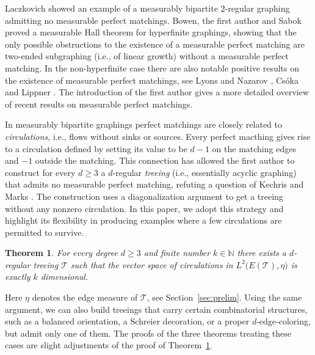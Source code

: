 \documentclass[10pt]{article}
\theoremstyle{plain}
\newtheorem{theorem}[lemma]{Theorem}
\theoremstyle{remark}
\newcommand{\1}{\mathbbm{1}}
\newcommand{\mcT}{\mathcal{T}}
\numberwithin{equation}{section}
\begin{document}
Laczkovich \cite{laczkovich1988closed} showed an example of a measurably bipartite $2$-regular graphing admitting no measurable perfect matchings. Bowen, the first author and Sabok proved a measurable Hall theorem for hyperfinite graphings, \cite{bowen2021perfect} showing that the only possible obstructions to the existence of a measurable perfect matching are two-ended subgraphing (i.e., of linear growth) without a measurable perfect matching.
In the non-hyperfinite case there are also notable positive results on the existence of measurable perfect matchings, see Lyons and Nazarov \cite{lyons2011perfect}, Cs\'oka and Lippner \cite{csoka2017invariant}.
The introduction of the first author \cite{kun2021measurable} gives a more detailed overview of recent results on measurable perfect matchings. 

In measurably bipartite graphings perfect matchings are closely related to \emph{circulations}, i.e., flows without sinks or sources. Every perfect macthing gives rise to a circulation defined by setting its value to be $d-1$ on the matching edges and $-1$ outside the matching. This connection has allowed the first author \cite{kun2021measurable} to 
construct for every $d \geq 3$ a $d$-regular \emph{treeing} (i.e., essentially acyclic graphing) that admits no measurable perfect matching,
refuting a question of Kechris and Marks %
\cite{kechris2016descriptive}. The construction uses a diagonalization argument to get a treeing without any nonzero circulation. In this paper, we adopt this strategy and highlight its flexibility in producing examples where a few circulations are permitted to survive.

\begin{theorem} \label{thm:finitely_many_circ}
   For every degree $d \geq 3$ and finite number $k \in \mathbb{N}$ there exists a $d$-regular treeing $\mcT$ such that the vector space of circulations in $L^2\big(E(\mcT), \eta \big)$ is exactly $k$ dimensional. %
\end{theorem}

Here $\eta$ denotes the edge measure of $\mcT$, see Section~\ref{sec:prelim}. Using the same argument, we can also build treeings that carry certain combinatorial structures, such as a balanced orientation, a Schreier decoration, or a proper $d$-edge-coloring, but admit only one of them. The proofs of the three theorems treating these cases are slight adjustments of the proof of Theorem~\ref{thm:finitely_many_circ}.
\end{document}

